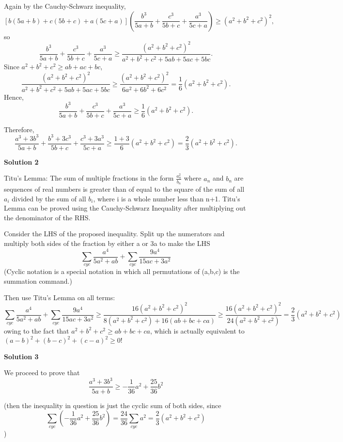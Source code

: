 \begin{enumerate}
 Again by the Cauchy-Schwarz inequality,
 \[[b(5a + b) + c(5b + c) + a(5c + a)] \left( \frac{b^3}{5a + b} + \frac{c^3}{5b + c} + \frac{a^3}{5c + a} \right) \ge (a^2 + b^2 + c^2)^2,\]so
 \[\frac{b^3}{5a + b} + \frac{c^3}{5b + c} + \frac{a^3}{5c + a} \ge \frac{(a^2 + b^2 + c^2)^2}{a^2 + b^2 + c^2 + 5ab + 5ac + 5bc}.\]Since $a^2 + b^2 + c^2 \ge ab + ac + bc$,
 \[\frac{(a^2 + b^2 + c^2)^2}{a^2 + b^2 + c^2 + 5ab + 5ac + 5bc} \ge \frac{(a^2 + b^2 + c^2)^2}{6a^2 + 6b^2 + 6c^2} = \frac{1}{6} (a^2 + b^2 + c^2).\]Hence,
 \[\frac{b^3}{5a + b} + \frac{c^3}{5b + c} + \frac{a^3}{5c + a} \ge \frac{1}{6} (a^2 + b^2 + c^2).\]

 Therefore,
 \[\frac{a^3 + 3b^3}{5a + b} + \frac{b^3 + 3c^3}{5b + c} + \frac{c^3 + 3a^3}{5c + a} \ge \frac{1 + 3}{6} (a^2 + b^2 + c^2) = \frac{2}{3} (a^2 + b^2 + c^2).\]




\textbf{Solution 2}

Titu's Lemma: The sum of multiple fractions in the form $\frac{a_n^2}{b_n}$ where $a_n$ and $b_n$ are sequences of real numbers is greater than of equal to the square of the sum of all $a_i$ divided by the sum of all $b_i$, where i is a whole number less than n+1. Titu's Lemma can be proved using the Cauchy-Schwarz Inequality after multiplying out the denominator of the RHS.

 Consider the LHS of the proposed inequality. Split up the numerators and multiply both sides of the fraction by either a or 3a to make the LHS
 \[\sum_{cyc} \frac {a^4} {5a^2+ab}+\sum_{cyc} \frac {9a^4} {15ac+3a^2}\](Cyclic notation is a special notation in which all permutations of (a,b,c) is the summation command.)

 Then use Titu's Lemma on all terms: 
 \[\sum_{cyc} \frac {a^4} {5a^2+ab} +\sum_{cyc} \frac {9a^4} {15ac+3a^2} \ge \frac {16(a^2+b^2+c^2)^2} {8(a^2+b^2+c^2)+16(ab+bc+ca)} \ge \frac {16(a^2 + b^2 + c^2)^2}{24(a^2 + b^2 + c^2)} = \frac{2}{3} (a^2 + b^2 + c^2)\] owing to the fact that $a^2+b^2+c^2 \ge ab+bc+ca$, which is actually equivalent to $(a-b)^2 + (b-c)^2 + (c-a)^2 \ge 0$!

 



\textbf{Solution 3}

We proceed to prove that
 \[\frac{a^3 + 3b^3}{5a + b} \ge -\frac{1}{36} a^2 + \frac{25}{36} b^2\]

 (then the inequality in question is just the cyclic sum of both sides, since 
 \[\sum_{cyc} (-\frac{1}{36} a^2 + \frac{25}{36} b^2) = \frac{24}{36}\sum_{cyc} a^2 = \frac{2}{3} (a^2+b^2+c^2)\])


\end{enumerate}
